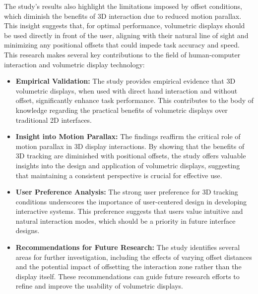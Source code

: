 The study's results also highlight the limitations imposed by offset conditions, which diminish the benefits of 3D interaction due to reduced motion parallax. This insight suggests that, for optimal performance, volumetric displays should be used directly in front of the user, aligning with their natural line of sight and minimizing any positional offsets that could impede task accuracy and speed. \\

This research makes several key contributions to the field of human-computer interaction and volumetric display technology:

\begin{itemize}
    \item \textbf{Empirical Validation:} The study provides empirical evidence that 3D volumetric displays, when used with direct hand interaction and without offset, significantly enhance task performance. This contributes to the body of knowledge regarding the practical benefits of volumetric displays over traditional 2D interfaces.

    \item \textbf{Insight into Motion Parallax:} The findings reaffirm the critical role of motion parallax in 3D display interactions. By showing that the benefits of 3D tracking are diminished with positional offsets, the study offers valuable insights into the design and application of volumetric displays, suggesting that maintaining a consistent perspective is crucial for effective use.

    \item \textbf{User Preference Analysis:} The strong user preference for 3D tracking conditions underscores the importance of user-centered design in developing interactive systems. This preference suggests that users value intuitive and natural interaction modes, which should be a priority in future interface designs.

    \item \textbf{Recommendations for Future Research:} The study identifies several areas for further investigation, including the effects of varying offset distances and the potential impact of offsetting the interaction zone rather than the display itself. These recommendations can guide future research efforts to refine and improve the usability of volumetric displays.
\end{itemize}